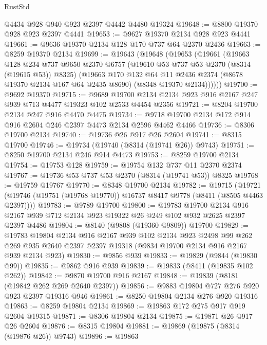 \begin{lexlean}{RustStd}
\begin{coremodule}
    @4434
    @928
    @940
    @923
    @2397
    @4442
    @4480
    @19324
@19648 := @8800 @19370 @928 @923 @2397 @4441
@19653 := @9627 @19370 @2134 @928 @923 @4441
@19661 := @9636 @19370 @2134 @128 @170 @737 @64 @2370 @2436
@19663 := @8259 @19370 @2134
@19699 := @19643
    (@19648
      (@19653
        (@19661
          (@19663
            @128
            @234
            @737
            @9650
            @2370
            @6757
            (@19610 @53 @737 @53 @2370 (@8314 (@19615 @53)) @8325)
            (@19663
              @170
              @132
              @64
              @11
              @2436
              @2374
              (@8678 @19370 @2134 @167 @64 @2435 @8690)
              (@8348 @19370 @2134))))))
@19700 := @9692 @19370
@19715 := @9689
    @19700
    @2134
    @2134
    @923
    @916
    @2167
    @247
    @939
    @713
    @4477
    @19323
    @102
    @2533
    @4454
    @2356
@19721 := @8204 @19700 @2134 @247 @916 @4470 @4475
@19734 := @9718 @19700 @2134 @172 @914 @916 @2604 @246 @2397 @4473 @2134 @2596 @4462 @4466
@19736 := @8306 @19700 @2134
@19740 := @19736 @26 @917 @26 @2604
@19741 := @8315 @19700
@19746 := @19734 (@19740 (@8314 (@19741 @26)) @9743)
@19751 := @8250 @19700 @2134 @246 @914 @4473
@19753 := @8259 @19700 @2134
@19754 := @19753 @128
@19759 := @19754 @132 @737 @11 @2370 @2374
@19767 := @19736 @53 @737 @53 @2370 (@8314 (@19741 @53)) @8325
@19768 := @19759 @19767
@19770 := @8348 @19700 @2134
@19782 := @19715
    (@19721 (@19746 (@19751 (@19768 @19770)) @16737 @8417 @9778 (@8411 (@8505 @4463 @2397))))
@19783 := @9789 @19700
@19800 := @19783
    @19700
    @2134
    @916
    @2167
    @939
    @712
    @2134
    @923
    @19322
    @26
    @249
    @102
    @932
    @2625
    @2397
    @2397
    @4486
@19804 := @8140 (@9808 (@19360 @9809)) @19700
@19829 := @19783
    @19804
    @2134
    @916
    @2167
    @939
    @102
    @2134
    @923
    @2498
    @99
    @262
    @269
    @935
    @2640
    @2397
    @2397
    @19318
    (@9834 @19700 @2134 @916 @2167 @939 @2134 @923)
@19830 := @9856 @939
@19833 := @19829 (@9844 (@19830 @99))
@19835 := @9862 @916 @939
@19839 := @19833 (@8411 (@19835 @102 @262))
@19842 := @9870 @19700 @916 @2167
@19848 := @19839 (@8181 (@19842 @262 @269 @2640 @2397))
@19856 := @9883 @19804 @727 @276 @920 @923 @2397 @19316 @946
@19861 := @8250 @19804 @2134 @276 @920 @19316
@19863 := @8259 @19804 @2134
@19869 := @19863 @172 @275 @917 @919 @2604 @19315
@19871 := @8306 @19804 @2134
@19875 := @19871 @26 @917 @26 @2604
@19876 := @8315 @19804
@19881 := @19869 (@19875 (@8314 (@19876 @26)) @9743)
@19896 := @19863

\end{coremodule}
\end{lexlean}
